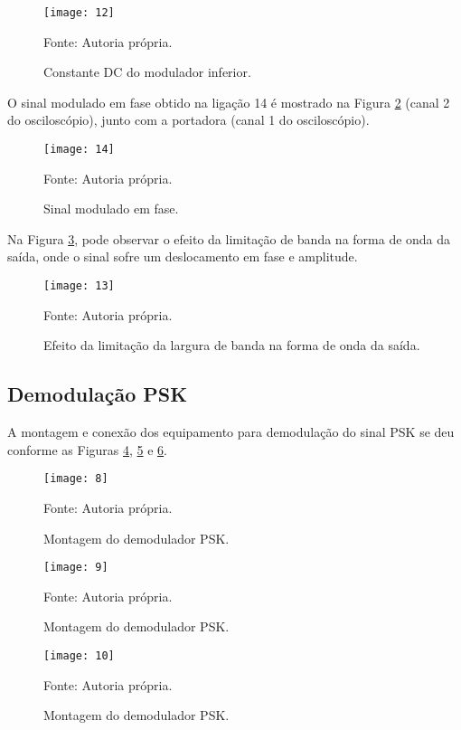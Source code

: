 	\begin{figure}[H]
		\centering
		\caption{Constante DC do modulador inferior.}
		\texttt{[image: 12]}
		
		\small Fonte: Autoria própria.
		\label{fig:12}
	\end{figure}
	
	O sinal modulado em fase obtido na ligação 14 é mostrado na Figura \ref{fig:14} (canal 2 do osciloscópio), junto com a portadora (canal 1 do osciloscópio).
	
	\begin{figure}[H]
		\centering
		\caption{Sinal modulado em fase.}
		\texttt{[image: 14]}
		
		\small Fonte: Autoria própria.
		\label{fig:14}
	\end{figure}
	
	Na Figura \ref{fig:13}, pode observar o efeito da limitação de banda na forma de onda da saída, onde o sinal sofre um deslocamento em fase e amplitude.

	\begin{figure}[H]
		\centering
		\caption{Efeito da limitação da largura de banda na forma de onda da saída.}
		\texttt{[image: 13]}
		
		\small Fonte: Autoria própria.
		\label{fig:13}
	\end{figure}	
	
\subsection{Demodulação PSK}

	A montagem e conexão dos equipamento para demodulação do sinal PSK se deu conforme as Figuras \ref{fig:8}, \ref{fig:9} e \ref{fig:10}.
	
	\begin{figure}[H]
		\centering
		\caption{Montagem do demodulador PSK.}
		\texttt{[image: 8]}
		
		\small Fonte: Autoria própria.
		\label{fig:8}
	\end{figure}
	
	\begin{figure}[H]
		\centering
		\caption{Montagem do demodulador PSK.}
		\texttt{[image: 9]}
		
		\small Fonte: Autoria própria.
		\label{fig:9}
	\end{figure}
	
	\begin{figure}[H]
		\centering
		\caption{Montagem do demodulador PSK.}
		\texttt{[image: 10]}
		
		\small Fonte: Autoria própria.
		\label{fig:10}
	\end{figure}

